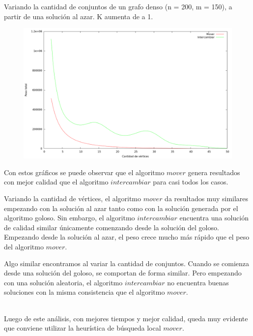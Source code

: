 Variando la cantidad de conjuntos de un grafo denso (n = 200, m = 150), a partir
de una solución al azar. K aumenta de a 1.
\vspace*{0.5cm}

\begin{figure}[h]
  \begin{center}
    \includegraphics[scale=0.35]{imagenes/local-random-k-peso.png}
  \end{center}
\end{figure}

\vspace*{0.5cm}

Con estos gráficos se puede observar que el algoritmo $mover$ genera resultados
con mejor calidad que el algoritmo $intercambiar$ para casi todos los casos.

Variando la cantidad de vértices, el algoritmo $mover$ da resultados muy similares
empezando con la solución al azar tanto como con la solución generada por el
algoritmo goloso. Sin embargo, el algoritmo $intercambiar$ encuentra una solución
de calidad similar únicamente comenzando desde la solución del goloso.
Empezando desde la solución al azar, el peso crece mucho más rápido que el peso
del algoritmo $mover$.

Algo similar encontramos al variar la cantidad de conjuntos. Cuando se comienza
desde una solución del goloso, se comportan de forma similar. Pero empezando con
una solución aleatoria, el algoritmo $intercambiar$ no encuentra buenas soluciones
con la misma consistencia que el algoritmo $mover$.

\\
Luego de este análisis, con mejores tiempos y mejor calidad, queda muy evidente
que conviene utilizar la heurística de búsqueda local $mover$.